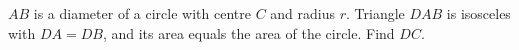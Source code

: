 $AB$ is a diameter of a circle with centre $C$ and radius $r$. Triangle $DAB$ is isosceles with $DA=DB$, and its area equals the area of the circle. Find $DC$.

